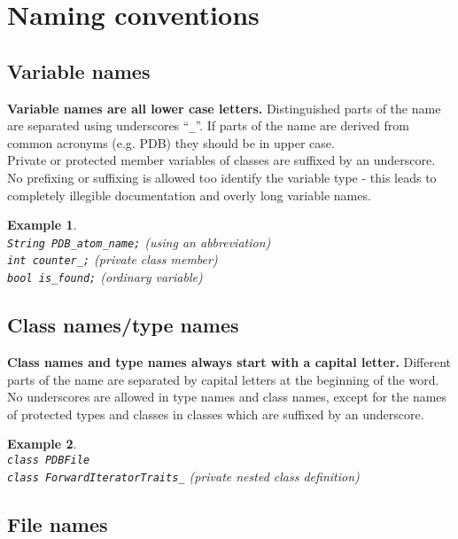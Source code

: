 \documentclass[a4paper,10pt]{article}
\newtheorem{example}{Example}
\begin{document}
\section{Naming conventions}


\subsection{Variable names}

{\bf Variable names are all lower case letters.} Distinguished parts of the name are
separated using underscores ``{\tt \_}''. If parts of the name are derived
from common acronyms (e.g. PDB) they should be in upper case.\\
Private or protected member variables of classes are suffixed by an
underscore.\\
No prefixing or suffixing is allowed too identify the variable type - this
leads to completely illegible documentation and overly long variable names.\\
\begin{example}\hspace*{2mm}\\
{\tt String PDB\_atom\_name;} (using an abbreviation)\\
{\tt int counter\_;} (private class member)\\
{\tt bool is\_found;} (ordinary variable)
\end{example}

\subsection{Class names/type names}

{\bf Class names and type names always start with a capital letter.} Different parts
of the name are separated by capital letters at the beginning of the word. No
underscores are allowed in type names and class names, except for the names of
protected types and classes in classes which are suffixed by an underscore.
\begin{example}\hspace*{2mm}\\
{\tt class PDBFile}\\
{\tt class ForwardIteratorTraits\_} (private nested class definition)\\
\end{example}

\subsection{File names}
\end{document}
